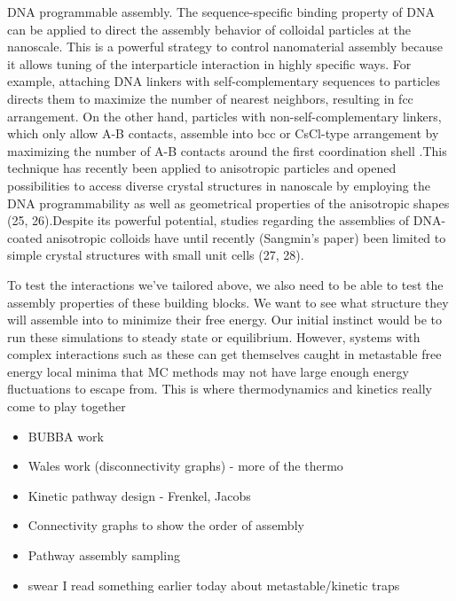 DNA programmable assembly. The sequence-specific binding property of DNA can be applied to direct the assembly behavior of colloidal particles at the nanoscale. This is a powerful strategy to control nanomaterial assembly because it allows tuning of the interparticle interaction in highly specific ways. For example, attaching DNA linkers with self-complementary sequences to particles directs them to maximize the number of nearest neighbors, resulting in fcc arrangement. On the other hand, particles with non-self-complementary linkers, which only allow A-B contacts, assemble into bcc or CsCl-type arrangement by maximizing the number of A-B contacts around the first coordination shell \cite{Park_2008_Nature}.This technique has recently been applied to anisotropic particles and opened possibilities to access diverse crystal structures in nanoscale by employing the DNA programmability as well as geometrical properties of the anisotropic shapes (25, 26).Despite its powerful potential, studies regarding the assemblies of DNA-coated anisotropic colloids have until recently (Sangmin's paper) been limited to simple crystal structures with small unit cells (27, 28). 

To test the interactions we've tailored above, we also need to be able to test the assembly properties of these building blocks.
We want to see what structure they will assemble into to minimize their free energy.
Our initial instinct would be to run these simulations to steady state or equilibrium.
However, systems with complex interactions such as these can get themselves caught in metastable free energy local minima that MC methods may not have large enough energy fluctuations to escape from.
This is where thermodynamics and kinetics really come to play together

\begin{itemize}
\item BUBBA work
\item Wales work (disconnectivity graphs) - more of the thermo
\item Kinetic pathway design - Frenkel, Jacobs
\item Connectivity graphs to show the order of assembly
\item Pathway assembly sampling
\item swear I read something earlier today about metastable/kinetic traps
\end{itemize}



